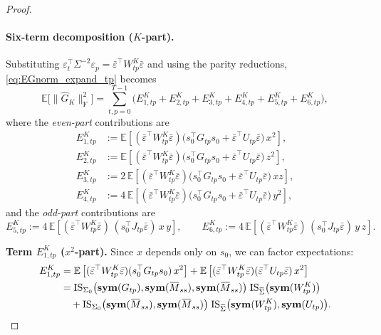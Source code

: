 \begin{proof}
\paragraph{Six-term decomposition ($K$-part).}
Substituting $\varepsilon_t^\top\Sigma^{-2}\varepsilon_p=\bar\varepsilon^\top W^K_{tp}\bar\varepsilon$ and using the parity reductions,
\eqref{eq:EGnorm_expand_tp} becomes
\[
\mathbb E\big[\|\widehat G_K\|_{\mathrm{F}}^2\big]
=\sum_{t,p=0}^{T-1}\big(E^{K}_{1,tp}+E^{K}_{2,tp}+E^{K}_{3,tp}+E^{K}_{4,tp}+E^{K}_{5,tp}+E^{K}_{6,tp}\big),
\]
where the \emph{even-part} contributions are
\begin{align*}
E^{K}_{1,tp}&:=\mathbb E \left[(\bar\varepsilon^\top W^K_{tp}\bar\varepsilon)\Big(s_0^\top G_{tp}s_0+\bar\varepsilon^\top U_{tp}\bar\varepsilon\Big)\,x^2\right],\\
E^{K}_{2,tp}&:=\mathbb E \left[(\bar\varepsilon^\top W^K_{tp}\bar\varepsilon)\Big(s_0^\top G_{tp}s_0+\bar\varepsilon^\top U_{tp}\bar\varepsilon\Big)\,z^2\right],\\
E^{K}_{3,tp}&:=2\,\mathbb E \left[(\bar\varepsilon^\top W^K_{tp}\bar\varepsilon)\Big(s_0^\top G_{tp}s_0+\bar\varepsilon^\top U_{tp}\bar\varepsilon\Big)\,x z\right],\\
E^{K}_{4,tp}&:=4\,\mathbb E \left[(\bar\varepsilon^\top W^K_{tp}\bar\varepsilon)\Big(s_0^\top G_{tp}s_0+\bar\varepsilon^\top U_{tp}\bar\varepsilon\Big)\,y^2\right],
\end{align*}
and the \emph{odd-part} contributions are
\begin{equation}\label{eq:EtpFtp_def}
E^{K}_{5,tp}:=4\,\mathbb E \left[(\bar\varepsilon^\top W^K_{tp}\bar\varepsilon)\,(s_0^\top J_{tp}\bar\varepsilon)\,x\,y\right],\qquad
E^{K}_{6,tp}:=4\,\mathbb E \left[(\bar\varepsilon^\top W^K_{tp}\bar\varepsilon)\,(s_0^\top J_{tp}\bar\varepsilon)\,y\,z\right].
\end{equation}

\noindent\textbf{Term $E^{K}_{1,tp}$ ($x^2$-part).}
Since $x$ depends only on $s_0$, we can factor expectations:
\begin{align}\label{eq:E1tp_final}
E^{K}_{1,tp}
&=\mathbb E \left[(\bar\varepsilon^\top W^K_{tp}\bar\varepsilon)(s_0^\top G_{tp}s_0)\,x^2\right]
+\mathbb E \left[(\bar\varepsilon^\top W^K_{tp}\bar\varepsilon)(\bar\varepsilon^\top U_{tp}\bar\varepsilon)\,x^2\right] \nonumber \\
&=\mathrm{IS}_{\Sigma_0}\big(\symfun(G_{tp}),\symfun(\overline M_{ss}),\symfun(\overline M_{ss})\big)\;
  \mathrm{IS}_{\overline\Sigma}\big(\symfun(W^K_{tp})\big) \nonumber \\
&\quad+
  \mathrm{IS}_{\Sigma_0} \big(\symfun(\overline M_{ss}),\symfun(\overline M_{ss})\big)\;
  \mathrm{IS}_{\overline\Sigma}\big(\symfun(W^K_{tp}),\symfun(U_{tp})\big).
\end{align}


\end{proof}

